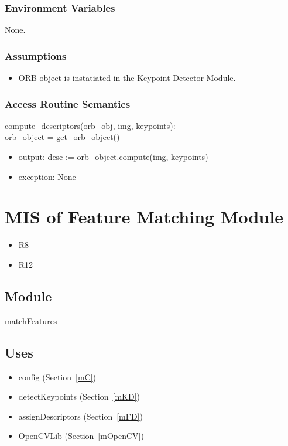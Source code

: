 \documentclass[12pt, titlepage]{article}
\begin{document}
\subsubsection{Environment Variables}
None.

\subsubsection{Assumptions}
\begin{itemize}
\item ORB object is instatiated in the Keypoint Detector Module.
\end{itemize}


\subsubsection{Access Routine Semantics}

\noindent compute\_descriptors(orb\_obj, img, keypoints):\\
orb\_object = get\_orb\_object()
\begin{itemize}
\item output: desc := orb\_object.compute(img, keypoints)
\item exception: None 
\end{itemize}




\section{MIS of Feature Matching Module} \label{mFM}
\begin{itemize}
  \item R8
  \item R12
\end{itemize}
\subsection{Module}

matchFeatures

\subsection{Uses}
\begin{itemize}
  \item config (Section~\ref{mC})
  \item detectKeypoints (Section~\ref{mKD})
  \item assignDescriptors (Section~\ref{mFD})
  \item OpenCVLib (Section~\ref{mOpenCV})
\end{itemize}
\end{document}
